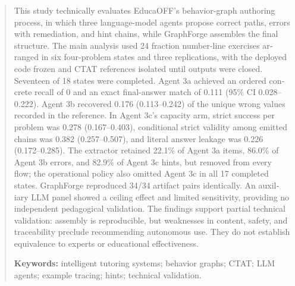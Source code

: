 \begin{otherlanguage}{english}
\renewcommand{\abstractname}{Abstract}
\begin{abstract}
This study technically evaluates EducaOFF's behavior-graph authoring process, in which three language-model agents propose correct paths, errors with remediation, and hint chains, while GraphForge assembles the final structure. The main analysis used 24 fraction number-line exercises arranged in six four-problem states and three replications, with the deployed code frozen and CTAT references isolated until outputs were closed. Seventeen of 18 states were completed. Agent 3a achieved an ordered concrete recall of 0 and an exact final-answer match of 0.111 (95\% CI 0.028--0.222). Agent 3b recovered 0.176 (0.113--0.242) of the unique wrong values recorded in the reference. In Agent 3c's capacity arm, strict success per problem was 0.278 (0.167--0.403), conditional strict validity among emitted chains was 0.382 (0.257--0.507), and literal answer leakage was 0.226 (0.172--0.285). The extractor retained 22.1\% of Agent 3a items, 86.0\% of Agent 3b errors, and 82.9\% of Agent 3c hints, but removed  from every flow; the operational policy also omitted Agent 3c in all 17 completed states. GraphForge reproduced 34/34 artifact pairs identically. An auxiliary LLM panel showed a ceiling effect and limited sensitivity, providing no independent pedagogical validation. The findings support partial technical validation: assembly is reproducible, but weaknesses in content, safety, and traceability preclude recommending autonomous use. They do not establish equivalence to experts or educational effectiveness.

\smallskip\noindent\textbf{Keywords:} intelligent tutoring systems; behavior graphs; CTAT; LLM agents; example tracing; hints; technical validation.
\end{abstract}
\end{otherlanguage}
